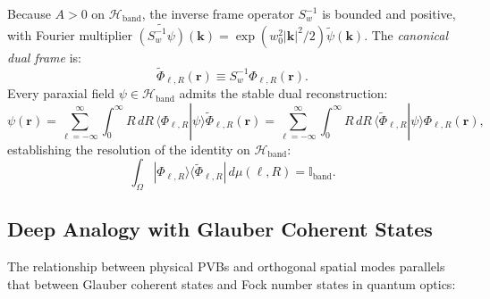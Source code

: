 \documentclass{optica-article}
\begin{document}
Because $A > 0$ on $\mathcal{H}_{\text{band}}$, the inverse frame operator $S_w^{-1}$ is bounded and positive, with Fourier multiplier $\widetilde{(S_w^{-1} \psi)}(\mathbf{k}) = \exp(w_0^2 |\mathbf{k}|^2 / 2) \widetilde{\psi}(\mathbf{k})$. The \emph{canonical dual frame} is:
\begin{equation}
\widetilde{\Phi}_{\ell, R}(\mathbf{r}) \equiv S_w^{-1} \Phi_{\ell, R}(\mathbf{r}).
\end{equation}
Every paraxial field $\psi \in \mathcal{H}_{\text{band}}$ admits the stable dual reconstruction:
\begin{equation}
\boxed{\psi(\mathbf{r}) = \sum_{\ell=-\infty}^\infty \int_0^\infty R \, dR \, \langle \Phi_{\ell, R} | \psi \rangle \widetilde{\Phi}_{\ell, R}(\mathbf{r}) = \sum_{\ell=-\infty}^\infty \int_0^\infty R \, dR \, \langle \widetilde{\Phi}_{\ell, R} | \psi \rangle \Phi_{\ell, R}(\mathbf{r}),}
\label{eq:dual_expansion}
\end{equation}
establishing the resolution of the identity on $\mathcal{H}_{\text{band}}$:
\begin{equation}
\int_\Omega |\Phi_{\ell, R}\rangle \langle \widetilde{\Phi}_{\ell, R}| \, d\mu(\ell, R) = \mathbb{I}_{\text{band}}.
\end{equation}

\subsection{Deep Analogy with Glauber Coherent States}

The relationship between physical PVBs and orthogonal spatial modes parallels that between Glauber coherent states and Fock number states in quantum optics:
\end{document}
